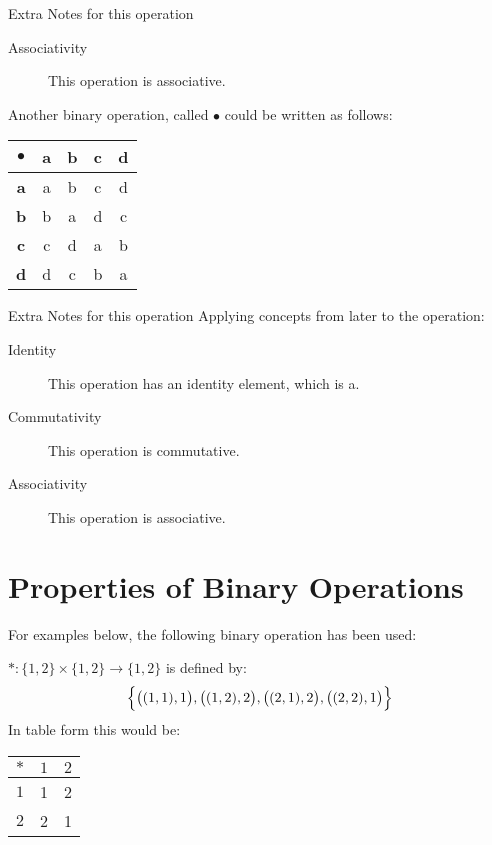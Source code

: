 \documentclass[../notes.tex]{subfiles}
\begin{document}
\begin{example}
\begin{center}
\begin{sidenote}{Extra Notes for this operation}
\begin{description}
							\item[Associativity] This operation is associative.
						\end{description}
					\end{sidenote}
					\end{center}
					Another binary operation, called $\bullet$ could be written as follows:
					\begin{center}
						\begin{tabular}{|c|c c c c|}
							\hline
							\textbf{$\bullet$} & \textbf{a} & \textbf{b} & \textbf{c} & \textbf{d}\\
							\hline
							\textbf{a} & a & b & c & d \\
							\textbf{b} & b & a & d & c \\
							\textbf{c} & c & d & a & b \\
							\textbf{d} & d & c & b & a \\
							\hline
						\end{tabular}
					\end{center}
					\begin{sidenote}{Extra Notes for this operation}
						Applying concepts from later to the operation:
						\begin{description}
							\item[Identity] This operation has an identity element, which is a.
							\item[Commutativity] This operation is commutative.
							\item[Associativity] This operation is associative.
						\end{description}
					\end{sidenote}
				\end{example}
			\pagebreak
		\section{Properties of Binary Operations}
			For examples below, the following binary operation has been used:
			\begin{adjustwidth}{1cm}{}
				$*: \{1, 2\} \times \{1, 2\} \rightarrow \{1, 2\}$ is defined by:
				\begin{align*}
					\Bigl\{\bigl((1, 1), 1\bigr), \bigl((1, 2), 2\bigr), \bigl((2, 1), 2\bigr), \bigl((2, 2), 1\bigr)\Bigr\}
				\end{align*}
				In table form this would be:
				\begin{center}
					\begin{tabular}{|c|c c|}
						\hline
						\textbf{$*$} & \textbf{$1$} & \textbf{$2$}\\
						\hline
						\textbf{$1$} & 1 & 2 \\
						\textbf{$2$} & 2 & 1 \\
						\hline
					\end{tabular}
				\end{center}
			\end{adjustwidth}
\end{document}
